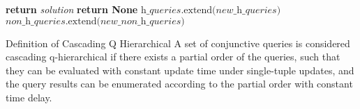 \documentclass[]{article}
\begin{document}
\begin{algorithm}
\begin{algorithmic}[1]
						\EndIf
		
					\EndFor
				\EndFor
				\State 
					\State \textbf{return} \textit{solution}
				\EndIf
					\State	\textbf{return None}
				\EndIf
				\State
				\State $\textit{h\_queries}\text{.extend(}\textit{new\_h\_queries})$
				\State $\textit{non\_h\_queries}\text{.extend(}\textit{new\_non\_h\_queries}\text{)}$
			\EndWhile
		\EndFunction
	\end{algorithmic}
\end{algorithm}

\begin{section}{Definition of Cascading Q Hierarchical}
	A set of conjunctive queries is considered cascading q-hierarchical if there exists a partial order of the queries, such that they can be evaluated with constant update time under single-tuple updates, and the query results can be enumerated according to the partial order with constant time delay.
	
\end{section}
\end{document}
